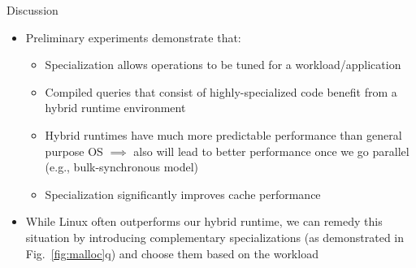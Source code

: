 \begin{block}{Discussion}

  \begin{itemize}
  \item Preliminary experiments demonstrate that:
    \begin{itemize}
    \item Specialization allows operations to be tuned for a workload/application
    \item Compiled queries that consist of highly-specialized code benefit from a hybrid runtime environment
    \item Hybrid runtimes have much more predictable performance than general purpose OS $\implies$ also will lead to better performance once we go parallel (e.g., bulk-synchronous model)
    \item Specialization significantly improves cache performance 
    \end{itemize}
  \item While Linux often outperforms our hybrid runtime, we can remedy this situation by introducing complementary specializations (as demonstrated in Fig.~\ref{fig:malloc}q) and choose them based on the workload
  \end{itemize}


\end{block}
